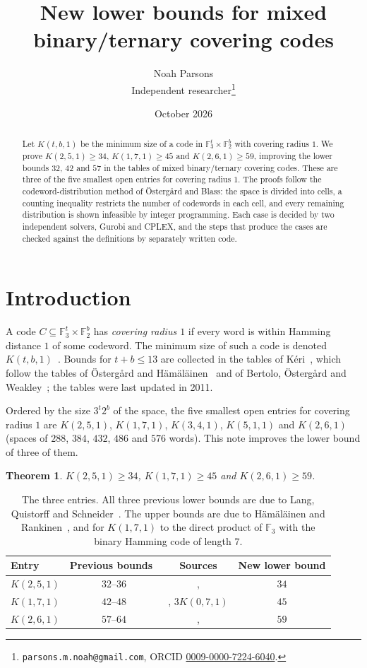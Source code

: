 \documentclass[11pt]{article}
\title{New lower bounds for mixed binary/ternary covering codes}
\author{Noah Parsons\\ \small Independent researcher\thanks{%
\texttt{parsons.m.noah@gmail.com}, ORCID \href{https://orcid.org/0009-0000-7224-6040}{0009-0000-7224-6040}.}}
\date{October 2026}
\newtheorem{theorem}{Theorem}
\theoremstyle{remark}
\newcommand{\F}{\mathbb{F}}
\begin{document}
\maketitle

\begin{abstract}
Let $K(t,b,1)$ be the minimum size of a code in $\F_3^t\times\F_2^b$ with covering radius $1$.
We prove $K(2,5,1)\ge 34$, $K(1,7,1)\ge 45$ and $K(2,6,1)\ge 59$, improving the lower bounds
$32$, $42$ and $57$ in the tables of mixed binary/ternary covering codes. These are three of the
five smallest open entries for covering radius $1$. The proofs follow the codeword-distribution
method of Östergård and Blass: the space is divided into cells, a counting inequality restricts
the number of codewords in each cell, and every remaining distribution is shown infeasible by
integer programming. Each case is decided by two independent solvers, Gurobi and CPLEX, and
the steps that produce the cases are checked against the definitions by separately written code.
\end{abstract}

\section{Introduction}

A code $C\subseteq\F_3^t\times\F_2^b$ has \emph{covering radius $1$} if every word is within
Hamming distance $1$ of some codeword. The minimum size of such a code is denoted
$K(t,b,1)$~\cite{cohen-book}. Bounds for $t+b\le 13$ are collected in the tables of
K\'eri~\cite{keri}, which follow the tables of Östergård and Hämäläinen~\cite{oh} and of
Bertolo, Östergård and Weakley~\cite{bow}; the tables were last updated in 2011.

Ordered by the size $3^t2^b$ of the space, the five smallest open entries for covering radius $1$
are $K(2,5,1)$, $K(1,7,1)$, $K(3,4,1)$, $K(5,1,1)$ and $K(2,6,1)$ (spaces of $288$, $384$, $432$,
$486$ and $576$ words). This note improves the lower bound of three of them.

\begin{theorem}\label{thm:main}
$K(2,5,1)\ge 34$, $K(1,7,1)\ge 45$ and $K(2,6,1)\ge 59$.
\end{theorem}

\begin{table}[h]
\centering
\begin{tabular}{lccc}
\toprule
Entry & Previous bounds~\cite{keri} & Sources & New lower bound \\
\midrule
$K(2,5,1)$ & $32$--$36$ & \cite{lqs}, \cite{hr} & $34$ \\
$K(1,7,1)$ & $42$--$48$ & \cite{lqs}, $3K(0,7,1)$ & $45$ \\
$K(2,6,1)$ & $57$--$64$ & \cite{lqs}, \cite{hr} & $59$ \\
\bottomrule
\end{tabular}
\caption{The three entries. All three previous lower bounds are due to Lang, Quistorff and
Schneider~\cite{lqs}. The upper bounds are due to Hämäläinen and Rankinen~\cite{hr}, and for
$K(1,7,1)$ to the direct product of $\F_3$ with the binary Hamming code of length $7$.}
\label{tab:entries}
\end{table}
\end{document}
